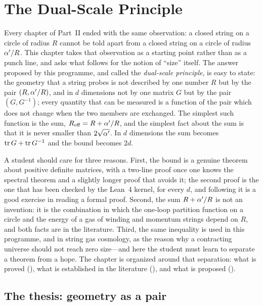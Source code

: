 \chapter{The Dual-Scale Principle}\label{ch:dualscale}

Every chapter of Part~II ended with the same observation: a closed string on a circle of
radius $R$ cannot be told apart from a closed string on a circle of radius $\alpha'/R$. This
chapter takes that observation as a starting point rather than as a punch line, and asks what
follows for the notion of ``size'' itself. The answer proposed by this programme, and called
the \emph{dual-scale principle}, is easy to state: the geometry
that a string probes is not described by one number $R$ but by the pair $(R,\alpha'/R)$, and in
$d$ dimensions not by one matrix $G$ but by the pair $(G,G^{-1})$; every quantity that can be
measured is a function of the pair which does not change when the two members are exchanged.
The simplest such function is the sum, $R_{\rm eff}=R+\alpha'/R$, and the simplest fact about the
sum is that it is never smaller than $2\sqrt{\alpha'}$. In $d$ dimensions the sum becomes
$\operatorname{tr} G+\operatorname{tr} G^{-1}$ and the bound becomes $2d$.

A student should care for three reasons. First, the bound is a genuine theorem about positive
definite matrices, with a two-line proof once one knows the spectral theorem and a slightly
longer proof that avoids it; the second proof is the one that has been checked by the Lean~4
kernel, for every $d$, and following it is a good exercise in reading a formal proof. Second,
the sum $R+\alpha'/R$ is not an invention: it is the combination in which the one-loop partition
function on a circle and the energy of a gas of winding and momentum strings depend on $R$,
and both facts are in the literature. Third, the same inequality is used in this programme,
and in string gas cosmology, as the reason why a contracting universe should not reach zero
size---and here the student must learn to separate a theorem from a hope. The chapter is
organized around that separation: what is proved (\TA), what is established in the literature
(\TL), and what is proposed (\TC).

\section{The thesis: geometry as a pair}\label{sec:dualscale:thesis}

